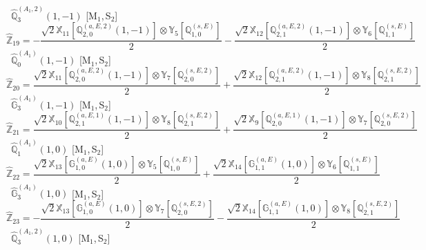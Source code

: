 \documentclass[fleqn,10pt,landscape]{article}
\begin{document}
\begin{itemize}
\noindent {} $\,\,\,\hat{\mathbb{Q}}_{3}^{(A_{1},2)}(1,-1)$ [M$_{1}$,\,S$_{2}$]
\begin{dmath*}
\hat{\mathbb{Z}}_{19}=- \frac{\sqrt{2} \mathbb{X}_{11}[\mathbb{Q}_{2,0}^{(a,E,2)}(1,-1)] \otimes\mathbb{Y}_{5}[\mathbb{Q}_{1,0}^{(s,E)}]}{2} - \frac{\sqrt{2} \mathbb{X}_{12}[\mathbb{Q}_{2,1}^{(a,E,2)}(1,-1)] \otimes\mathbb{Y}_{6}[\mathbb{Q}_{1,1}^{(s,E)}]}{2}
\end{dmath*}
\vspace{4mm}
\noindent {} $\,\,\,\hat{\mathbb{Q}}_{0}^{(A_{1})}(1,-1)$ [M$_{1}$,\,S$_{2}$]
\begin{dmath*}
\hat{\mathbb{Z}}_{20}=\frac{\sqrt{2} \mathbb{X}_{11}[\mathbb{Q}_{2,0}^{(a,E,2)}(1,-1)] \otimes\mathbb{Y}_{7}[\mathbb{Q}_{2,0}^{(s,E,2)}]}{2} + \frac{\sqrt{2} \mathbb{X}_{12}[\mathbb{Q}_{2,1}^{(a,E,2)}(1,-1)] \otimes\mathbb{Y}_{8}[\mathbb{Q}_{2,1}^{(s,E,2)}]}{2}
\end{dmath*}
\vspace{4mm}
\noindent {} $\,\,\,\hat{\mathbb{G}}_{3}^{(A_{1})}(1,-1)$ [M$_{1}$,\,S$_{2}$]
\begin{dmath*}
\hat{\mathbb{Z}}_{21}=\frac{\sqrt{2} \mathbb{X}_{10}[\mathbb{Q}_{2,1}^{(a,E,1)}(1,-1)] \otimes\mathbb{Y}_{8}[\mathbb{Q}_{2,1}^{(s,E,2)}]}{2} + \frac{\sqrt{2} \mathbb{X}_{9}[\mathbb{Q}_{2,0}^{(a,E,1)}(1,-1)] \otimes\mathbb{Y}_{7}[\mathbb{Q}_{2,0}^{(s,E,2)}]}{2}
\end{dmath*}
\vspace{4mm}
\noindent {} $\,\,\,\hat{\mathbb{Q}}_{1}^{(A_{1})}(1,0)$ [M$_{1}$,\,S$_{2}$]
\begin{dmath*}
\hat{\mathbb{Z}}_{22}=\frac{\sqrt{2} \mathbb{X}_{13}[\mathbb{G}_{1,0}^{(a,E)}(1,0)] \otimes\mathbb{Y}_{5}[\mathbb{Q}_{1,0}^{(s,E)}]}{2} + \frac{\sqrt{2} \mathbb{X}_{14}[\mathbb{G}_{1,1}^{(a,E)}(1,0)] \otimes\mathbb{Y}_{6}[\mathbb{Q}_{1,1}^{(s,E)}]}{2}
\end{dmath*}
\vspace{4mm}
\noindent {} $\,\,\,\hat{\mathbb{G}}_{3}^{(A_{1})}(1,0)$ [M$_{1}$,\,S$_{2}$]
\begin{dmath*}
\hat{\mathbb{Z}}_{23}=- \frac{\sqrt{2} \mathbb{X}_{13}[\mathbb{G}_{1,0}^{(a,E)}(1,0)] \otimes\mathbb{Y}_{7}[\mathbb{Q}_{2,0}^{(s,E,2)}]}{2} - \frac{\sqrt{2} \mathbb{X}_{14}[\mathbb{G}_{1,1}^{(a,E)}(1,0)] \otimes\mathbb{Y}_{8}[\mathbb{Q}_{2,1}^{(s,E,2)}]}{2}
\end{dmath*}
\vspace{4mm}
\noindent {} $\,\,\,\hat{\mathbb{Q}}_{3}^{(A_{1},2)}(1,0)$ [M$_{1}$,\,S$_{2}$]

\end{itemize}
\end{document}
